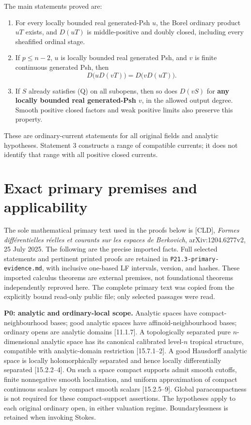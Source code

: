 \documentclass[
  11pt,
]{article}
\providecommand{\tightlist}{%
  \setlength{\itemsep}{0pt}\setlength{\parskip}{0pt}}
\begin{document}
The main statements proved are:

\begin{enumerate}
\def\labelenumi{\arabic{enumi}.}
\tightlist
\item
  For every locally bounded real generated-Psh \(u\), the Borel ordinary
  product \(uT\) exists, and \(D(uT)\) is middle-positive and doubly
  closed, including every sheafified ordinal stage.
\item
  If \(p\leq n-2\), \(u\) is locally bounded real generated Psh, and
  \(v\) is finite continuous generated Psh, then
  \[D\bigl(uD(vT)\bigr)=D\bigl(vD(uT)\bigr).                    \tag{S}\]
\item
  If \(S\) already satisfies (Q) on all subopens, then so does \(D(vS)\)
  for \textbf{any locally bounded real generated-Psh \(v\)}, in the
  allowed output degree. Smooth positive closed factors and weak
  positive limits also preserve this property.
\end{enumerate}

These are ordinary-current statements for all original fields and
analytic hypotheses. Statement 3 constructs a range of compatible
currents; it does not identify that range with all positive closed
currents.

\section{Exact primary premises and
applicability}\label{exact-primary-premises-and-applicability}

The sole mathematical primary text used in the proofs below is
{[}CLD{]}, \emph{Formes différentielles réelles et courants sur les
espaces de Berkovich}, arXiv:1204.6277v2, 25 July 2025. The following
are the precise imported facts. Full selected statements and pertinent
printed proofs are retained in \texttt{P21.3-primary-evidence.md}, with
inclusive one-based LF intervals, version, and hashes. These imported
calculus theorems are external premises, not foundational theorems
independently reproved here. The complete primary text was copied from
the explicitly bound read-only public file; only selected passages were
read.

\textbf{P0: analytic and ordinary-local scope.} Analytic spaces have
compact-neighbourhood bases; good analytic spaces have
affinoid-neighbourhood bases; ordinary opens are analytic domains
{[}11.1.7{]}. A topologically separated pure \(n\)-dimensional analytic
space has its canonical calibrated level-\(n\) tropical structure,
compatible with analytic-domain restriction {[}15.7.1--2{]}. A good
Hausdorff analytic space is locally holomorphically separated and hence
locally differentially separated {[}15.2.2--4{]}. On such a space
compact supports admit smooth cutoffs, finite nonnegative smooth
localization, and uniform approximation of compact continuous scalars by
compact smooth scalars {[}15.2.5--9{]}. Global paracompactness is not
required for these compact-support assertions. The hypotheses apply to
each original ordinary open, in either valuation regime.
Boundarylessness is retained when invoking Stokes.
\end{document}
